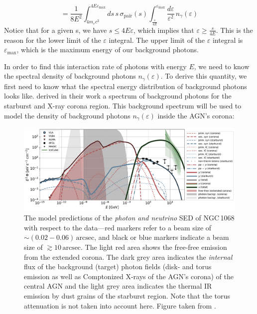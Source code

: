 \begin{equation}
    =  \frac{1}{8E^2}\int_{4m_ec^2}^{4E\varepsilon_{\max}}ds\,s\,\sigma_{\text{pair}}(s)\int_{\frac{s}{4E}}^{\varepsilon_{\max}}\frac{d\varepsilon}{\varepsilon^2}\,n_{\gamma}(\varepsilon)
    \label{eq:interaction_rate_third_one}
\end{equation}
Notice that for a given s, we have $s \leq 4E\varepsilon$, which implies that $\varepsilon \geq \frac{s}{4E}$. This is the reason for the lower limit of the $\varepsilon$ integral. The upper limit of the $\varepsilon$ integral is $\varepsilon_{\max}$, which is the maximum energy of our background photons.

In order to find this interaction rate of photons with energy $E$, we need to know the spectral density of background photons $n_{\gamma}(\varepsilon)$. To derive this quantity, we first need to know what the spectral energy distribution of background photons looks like. \citet{Eichmann_2022} derived in their work a spectrum of background photons for the starburst and X-ray corona region. This background spectrum will be used to model the density of background photons $n_{\gamma}(\varepsilon)$ inside the AGN's corona:


\begin{figure}[H]
    \includegraphics[width=\textwidth]{Figures/fit5b2_SED_details.pdf}
    \centering
    \caption{The model predictions of the \emph{photon and neutrino} SED of NGC\,1068 with respect to the data---red markers refer to a beam size of $\sim (0.02-0.06)\,\text{arcsec}$, and black or blue markers indicate a beam size of $\gtrsim 10\,\text{arcsec}$. The light red area shows the free-free emission from the extended corona. The dark grey area indicates the \emph{internal} flux of the background (target) photon fields (disk- and torus emission as well as Comptonized X-rays of the AGN's corona) of the central AGN and the light grey area indicates the thermal IR emission by dust grains of the starburst region. Note that the torus attenuation is not taken into account here. Figure taken from \citet{Eichmann_2022}.} 
    \label{fig:background_spectral_density}
\end{figure}

